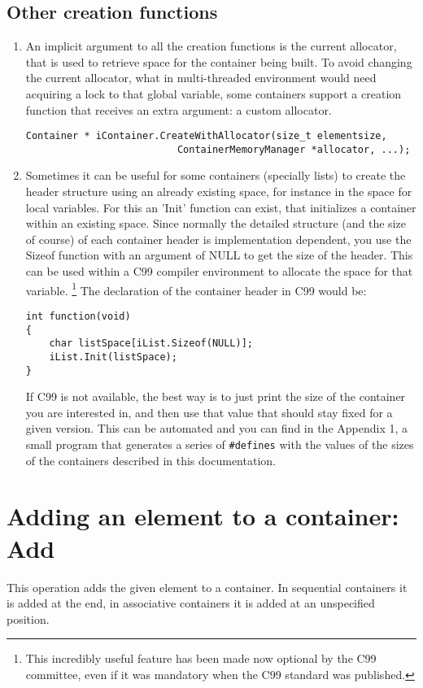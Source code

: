 \documentclass[12pt,a4paper]{memoir} %
\newcommand{\Null}{
{\footnotesize NULL}
}
\begin{document}
\subsection{Other creation functions}
\begin{enumerate}
\item
An implicit argument to all the creation functions is the current allocator, that is used to retrieve space for the container being built. To avoid changing the current allocator, what in multi-threaded environment would need acquiring a lock to that global variable, some containers support a creation function that receives an extra argument: a custom allocator.
\begin{verbatim}
Container * iContainer.CreateWithAllocator(size_t elementsize,
                          ContainerMemoryManager *allocator, ...);
\end{verbatim}
\item
Sometimes it can be useful for some containers (specially lists) to create the  header structure using an already existing space, for instance in the space for local variables. For this an 'Init' function can exist, that initializes a container within an existing space.
Since normally the detailed structure (and the size of course) of each container header is implementation dependent, you use the Sizeof function with an argument of\Null to get the size of the header. This can be used within a C99 compiler environment to allocate the space for that variable.
\footnote{This incredibly useful feature has been made now optional by the C99 committee, even if it was mandatory when the C99 standard was published.}
The declaration of the container header in C99 would be:
\begin{verbatim}
int function(void)
{
    char listSpace[iList.Sizeof(NULL)];
    iList.Init(listSpace);
}
\end{verbatim}
If C99 is not available, the best way is to just print the size of the container you are interested in, and then use that value that should stay fixed for a given version. This can be automated and you can find in the Appendix 1, a small program that generates a series of \texttt{\#defines} with the values of the sizes of the containers described in this documentation.
\end{enumerate}
\section{Adding an element to a container: Add}
This operation adds the given element to a container. In sequential containers it is added at the end, in associative containers it is added at an unspecified position.
\end{document}
